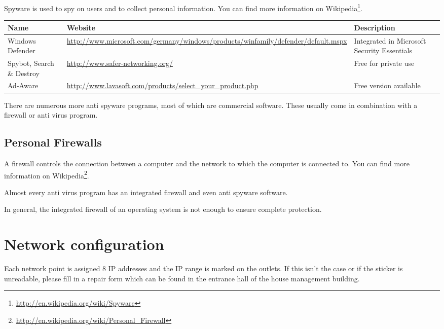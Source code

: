 \documentclass[a4paper,12pt]{scrartcl}
\begin{document}
Spyware is used to spy on users and to collect personal information. You can find more information on Wikipedia\footnote{\url{http://en.wikipedia.org/wiki/Spyware}}.

\begin{center}
  \begin{tabularx}{\linewidth}{|p{.18\linewidth}Xp{.3\linewidth}|}
    \hline
    Name & Website & Description\\
    \hline \hline
    Windows Defender & \url{http://www.microsoft.com/germany/windows/products/winfamily/defender/default.mspx} & Integrated in Microsoft Security Essentials\\
    \hline
    Spybot, Search \& Destroy & \url{http://www.safer-networking.org/} & Free for private use\\
    \hline
    Ad-Aware & \url{http://www.lavasoft.com/products/select\_your\_product.php} & Free version available\\
    \hline
  \end{tabularx}
\end{center}

There are numerous more anti spyware programs, most of which are commercial software. These usually come in combination with a firewall or anti virus program.

\subsection*{Personal Firewalls}

A firewall controls the connection between a computer and the network to which the computer is connected to. You can find more information on Wikipedia\footnote{\url{http://en.wikipedia.org/wiki/Personal\_Firewall}}.

Almost every anti virus program has an integrated firewall and even anti spyware software.

In general, the integrated firewall of an operating system is not enough to ensure complete protection.
\newpage

\section*{Network configuration}

Each network point is assigned 8 IP addresses and the IP range is marked on the outlets. If this isn't the case or if the sticker is unreadable, please fill in a repair form which can be found in the entrance hall of the house management building.
\end{document}
